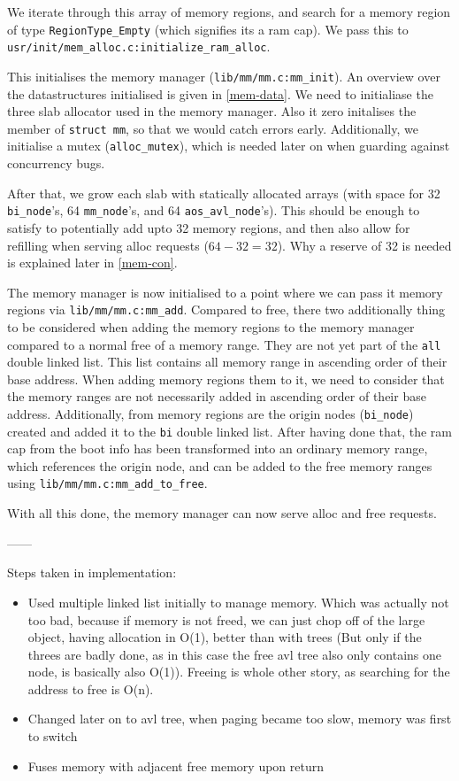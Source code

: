 We iterate through this array of memory regions, and search for a memory region
of type \verb|RegionType_Empty| (which signifies its a ram cap).
We pass this to \verb|usr/init/mem_alloc.c:initialize_ram_alloc|.

This initialises the memory manager (\verb|lib/mm/mm.c:mm_init|).
An overview over the datastructures initialised is given in \ref{mem-data}.
We need to initialiase the three slab allocator used in the memory manager.
Also it zero initalises the member of \verb|struct mm|, so that we would catch
errors early.
Additionally, we initialise a mutex (\verb|alloc_mutex|), which is needed later
on when guarding against concurrency bugs.

After that, we grow each slab with statically allocated arrays (with space for
32 \verb|bi_node|'s, 64 \verb|mm_node|'s, and 64 \verb|aos_avl_node|'s).
This should be enough to satisfy to potentially add upto 32 memory regions,
and then also allow for refilling when serving alloc requests ($64-32=32$).
Why a reserve of 32 is needed is explained later in \ref{mem-con}.

The memory manager is now initialised to a point where we can pass it memory
regions via \verb|lib/mm/mm.c:mm_add|.
Compared to free, there two additionally thing to be considered when adding the
memory regions to the memory manager compared to a normal free of a memory
range.
They are not yet part of the \verb|all| double linked list.
This list contains all memory range in ascending order of their base address.
When adding memory regions them to it, we need to consider that the memory
ranges are not necessarily added in ascending order of their base address.
Additionally, from memory regions are the origin nodes (\verb|bi_node|) created
and added it to the \verb|bi| double linked list.
After having done that, the ram cap from the boot info has been transformed into
an ordinary memory range, which references the origin node, and can be added to
the free memory ranges using \verb|lib/mm/mm.c:mm_add_to_free|.

With all this done, the memory manager can now serve alloc and free requests.

------

Steps taken in implementation:
\begin{itemize}
	\item Used multiple linked list initially to manage memory.
				Which was actually not too bad, because if memory is not freed, we can
				just chop off of the large object, having allocation in O(1), better than
				with trees (But only if the threes are badly done, as in this case the
				free avl tree also only contains one node, is basically also O(1)).
				Freeing is whole other story, as searching for the address to free is O(n).
	\item Changed later on to avl tree, when paging became too slow, memory was first to switch
	\item Fuses memory with adjacent free memory upon return
\end{itemize}

